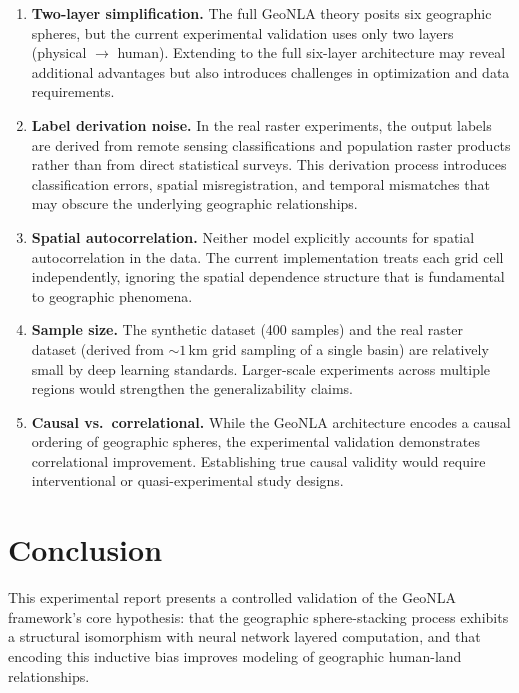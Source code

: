 \documentclass[a4paper,11pt]{article}
\begin{document}
\begin{enumerate}[label=\arabic*.]
    \item \textbf{Two-layer simplification.} The full GeoNLA theory posits six geographic spheres, but the current experimental validation uses only two layers (physical $\to$ human). Extending to the full six-layer architecture may reveal additional advantages but also introduces challenges in optimization and data requirements.

    \item \textbf{Label derivation noise.} In the real raster experiments, the output labels are derived from remote sensing classifications and population raster products rather than from direct statistical surveys. This derivation process introduces classification errors, spatial misregistration, and temporal mismatches that may obscure the underlying geographic relationships.

    \item \textbf{Spatial autocorrelation.} Neither model explicitly accounts for spatial autocorrelation in the data. The current implementation treats each grid cell independently, ignoring the spatial dependence structure that is fundamental to geographic phenomena.

    \item \textbf{Sample size.} The synthetic dataset (400 samples) and the real raster dataset (derived from ${\sim}1$\,km grid sampling of a single basin) are relatively small by deep learning standards. Larger-scale experiments across multiple regions would strengthen the generalizability claims.

    \item \textbf{Causal vs.\ correlational.} While the GeoNLA architecture encodes a causal ordering of geographic spheres, the experimental validation demonstrates correlational improvement. Establishing true causal validity would require interventional or quasi-experimental study designs.
\end{enumerate}

\section{Conclusion}
\label{sec:conclusion}

This experimental report presents a controlled validation of the GeoNLA framework's core hypothesis: that the geographic sphere-stacking process exhibits a structural isomorphism with neural network layered computation, and that encoding this inductive bias improves modeling of geographic human-land relationships.
\end{document}
